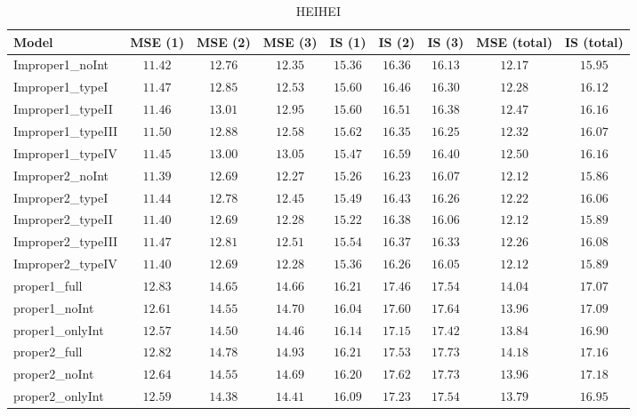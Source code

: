 \begin{table}

\caption{\label{tab:model-choice-sc5}HEIHEI}
\centering
\begin{tabular}{lcccccccc}
\hline
Model  & MSE (1) & MSE (2) & MSE (3) & IS (1) & IS (2) & IS (3) & MSE (total) & \multicolumn{1}{c}{IS (total)} \\ 
\hline
Improper1_noInt  & $11.42$ & $12.76$ & $12.35$ & $15.36$ & $16.36$ & $16.13$ & $12.17$ & $15.95$ \\
Improper1_typeI  & $11.47$ & $12.85$ & $12.53$ & $15.60$ & $16.46$ & $16.30$ & $12.28$ & $16.12$ \\
Improper1_typeII  & $11.46$ & $13.01$ & $12.95$ & $15.60$ & $16.51$ & $16.38$ & $12.47$ & $16.16$ \\
Improper1_typeIII  & $11.50$ & $12.88$ & $12.58$ & $15.62$ & $16.35$ & $16.25$ & $12.32$ & $16.07$ \\
Improper1_typeIV  & $11.45$ & $13.00$ & $13.05$ & $15.47$ & $16.59$ & $16.40$ & $12.50$ & $16.16$ \\
Improper2_noInt  & $11.39$ & $12.69$ & $12.27$ & $15.26$ & $16.23$ & $16.07$ & $12.12$ & $15.86$ \\
Improper2_typeI  & $11.44$ & $12.78$ & $12.45$ & $15.49$ & $16.43$ & $16.26$ & $12.22$ & $16.06$ \\
Improper2_typeII  & $11.40$ & $12.69$ & $12.28$ & $15.22$ & $16.38$ & $16.06$ & $12.12$ & $15.89$ \\
Improper2_typeIII  & $11.47$ & $12.81$ & $12.51$ & $15.54$ & $16.37$ & $16.33$ & $12.26$ & $16.08$ \\
Improper2_typeIV  & $11.40$ & $12.69$ & $12.28$ & $15.36$ & $16.26$ & $16.05$ & $12.12$ & $15.89$ \\
proper1_full  & $12.83$ & $14.65$ & $14.66$ & $16.21$ & $17.46$ & $17.54$ & $14.04$ & $17.07$ \\
proper1_noInt  & $12.61$ & $14.55$ & $14.70$ & $16.04$ & $17.60$ & $17.64$ & $13.96$ & $17.09$ \\
proper1_onlyInt  & $12.57$ & $14.50$ & $14.46$ & $16.14$ & $17.15$ & $17.42$ & $13.84$ & $16.90$ \\
proper2_full  & $12.82$ & $14.78$ & $14.93$ & $16.21$ & $17.53$ & $17.73$ & $14.18$ & $17.16$ \\
proper2_noInt  & $12.64$ & $14.55$ & $14.69$ & $16.20$ & $17.62$ & $17.73$ & $13.96$ & $17.18$ \\
proper2_onlyInt  & $12.59$ & $14.38$ & $14.41$ & $16.09$ & $17.23$ & $17.54$ & $13.79$ & $16.95$ \\
\hline 
\end{tabular}


\end{table}